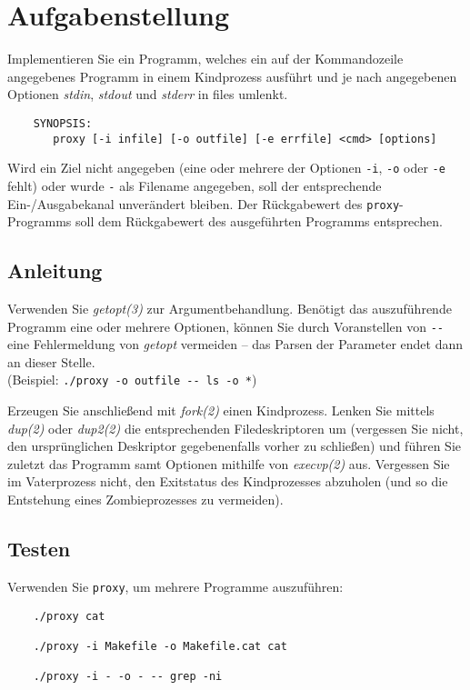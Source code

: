 




\section*{Aufgabenstellung}

Implementieren Sie ein Programm, welches ein auf der Kommandozeile angegebenes
Programm in einem Kindprozess ausführt und je nach angegebenen Optionen 
\emph{stdin}, \emph{stdout} und \emph{stderr} in files umlenkt.

\begin{verbatim}
    SYNOPSIS:
       proxy [-i infile] [-o outfile] [-e errfile] <cmd> [options]
\end{verbatim}

Wird ein Ziel nicht angegeben (eine oder mehrere der Optionen \verb_-i_,
\verb_-o_ oder \verb_-e_ fehlt) oder wurde \verb_-_ als Filename angegeben, soll
der entsprechende Ein-/Ausgabekanal unverändert bleiben. Der Rückgabewert des
\verb_proxy_-Programms soll dem Rückgabewert des ausgeführten Programms
entsprechen.

\subsection*{Anleitung}

Verwenden Sie \emph{getopt(3)} zur Argumentbehandlung. Benötigt das
auszuführende Programm eine oder mehrere Optionen, können Sie durch Voranstellen
von \verb|--| eine Fehlermeldung von {\em getopt} vermeiden – das Parsen der
Parameter endet dann an dieser Stelle.\\
(Beispiel: \verb|./proxy -o outfile -- ls -o *|)

Erzeugen Sie anschließend mit \emph{fork(2)} einen Kindprozess. Lenken Sie
mittels \emph{dup(2)} oder \emph{dup2(2)} die entsprechenden Filedeskriptoren um
(vergessen Sie nicht, den ursprünglichen Deskriptor gegebenenfalls vorher zu
schließen) und führen Sie zuletzt das Programm samt Optionen mithilfe von
\emph{execvp(2)} aus. Vergessen Sie im Vaterprozess nicht, den Exitstatus des
Kindprozesses abzuholen (und so die Entstehung eines Zombieprozesses zu
vermeiden).

\subsection*{Testen}

Verwenden Sie \verb_proxy_, um mehrere Programme auszuführen:

\begin{verbatim}
	./proxy cat
	
	./proxy -i Makefile -o Makefile.cat cat

	./proxy -i - -o - -- grep -ni
\end{verbatim}

\osueguidelinestwo


